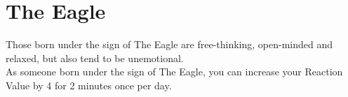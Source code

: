 \section{The Eagle}

Those born under the sign of The Eagle are free-thinking, open-minded and relaxed, but also tend to be unemotional.\\
As someone born under the sign of The Eagle, you can increase your Reaction Value by 4 for 2 minutes once per day.\\